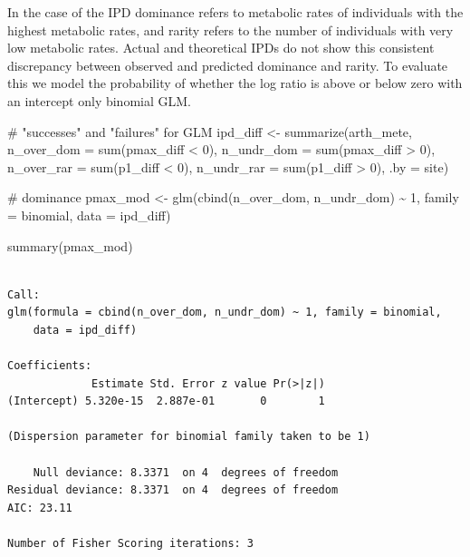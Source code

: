 \documentclass[
  letterpaper,
  DIV=11,
  numbers=noendperiod]{scrartcl}
\newenvironment{Shaded}{\begin{snugshade}}{\end{snugshade}}
\newcommand{\AttributeTok}[1]{\textcolor[rgb]{0.40,0.45,0.13}{#1}}
\newcommand{\CommentTok}[1]{\textcolor[rgb]{0.37,0.37,0.37}{#1}}
\newcommand{\DecValTok}[1]{\textcolor[rgb]{0.68,0.00,0.00}{#1}}
\newcommand{\FunctionTok}[1]{\textcolor[rgb]{0.28,0.35,0.67}{#1}}
\newcommand{\NormalTok}[1]{\textcolor[rgb]{0.00,0.23,0.31}{#1}}
\newcommand{\OtherTok}[1]{\textcolor[rgb]{0.00,0.23,0.31}{#1}}
\newcommand{\SpecialCharTok}[1]{\textcolor[rgb]{0.37,0.37,0.37}{#1}}
\begin{document}
In the case of the IPD dominance refers to metabolic rates of
individuals with the highest metabolic rates, and rarity refers to the
number of individuals with very low metabolic rates. Actual and
theoretical IPDs do not show this consistent discrepancy between
observed and predicted dominance and rarity. To evaluate this we model
the probability of whether the log ratio is above or below zero with an
intercept only binomial GLM.

\begin{Shaded}
\begin{Highlighting}[]
\CommentTok{\# "successes" and "failures" for GLM}
\NormalTok{ipd\_diff }\OtherTok{\textless{}{-}} \FunctionTok{summarize}\NormalTok{(arth\_mete, }
                      \AttributeTok{n\_over\_dom =} \FunctionTok{sum}\NormalTok{(pmax\_diff }\SpecialCharTok{\textless{}} \DecValTok{0}\NormalTok{), }
                      \AttributeTok{n\_undr\_dom =} \FunctionTok{sum}\NormalTok{(pmax\_diff }\SpecialCharTok{\textgreater{}} \DecValTok{0}\NormalTok{), }
                      \AttributeTok{n\_over\_rar =} \FunctionTok{sum}\NormalTok{(p1\_diff }\SpecialCharTok{\textless{}} \DecValTok{0}\NormalTok{), }
                      \AttributeTok{n\_undr\_rar =} \FunctionTok{sum}\NormalTok{(p1\_diff }\SpecialCharTok{\textgreater{}} \DecValTok{0}\NormalTok{), }
                      \AttributeTok{.by =}\NormalTok{ site)}

\CommentTok{\# dominance }
\NormalTok{pmax\_mod }\OtherTok{\textless{}{-}} \FunctionTok{glm}\NormalTok{(}\FunctionTok{cbind}\NormalTok{(n\_over\_dom, n\_undr\_dom) }\SpecialCharTok{\textasciitilde{}} \DecValTok{1}\NormalTok{, }
                \AttributeTok{family =}\NormalTok{ binomial, }\AttributeTok{data =}\NormalTok{ ipd\_diff) }

\FunctionTok{summary}\NormalTok{(pmax\_mod)}
\end{Highlighting}
\end{Shaded}

\begin{verbatim}

Call:
glm(formula = cbind(n_over_dom, n_undr_dom) ~ 1, family = binomial, 
    data = ipd_diff)

Coefficients:
             Estimate Std. Error z value Pr(>|z|)
(Intercept) 5.320e-15  2.887e-01       0        1

(Dispersion parameter for binomial family taken to be 1)

    Null deviance: 8.3371  on 4  degrees of freedom
Residual deviance: 8.3371  on 4  degrees of freedom
AIC: 23.11

Number of Fisher Scoring iterations: 3
\end{verbatim}
\end{document}
